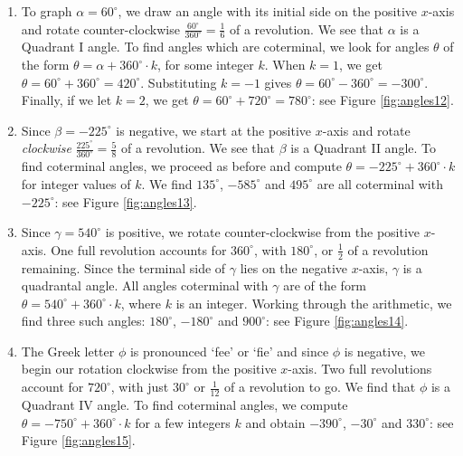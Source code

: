 {
\begin{enumerate}

\item  To graph $\alpha = 60^{\circ}$, we draw an angle with its initial side on the positive $x$-axis and rotate counter-clockwise $\frac{60^{\circ}}{360^{\circ}} = \frac{1}{6}$ of a revolution.  We see that $\alpha$ is a Quadrant I angle.  To find angles which are coterminal, we look for angles $\theta$ of the form $\theta = \alpha + 360^{\circ} \cdot k$, for some integer $k$.  When $k = 1$, we get $\theta =  60^{\circ} + 360^{\circ} = 420^{\circ}$.   Substituting $k = -1$ gives $\theta = 60^{\circ} - 360^{\circ} = -300^{\circ}$.  Finally, if we let $k = 2$, we get $\theta =  60^{\circ} + 720^{\circ} = 780^{\circ}$: see Figure \ref{fig:angles12}.  


\item  Since $\beta = - 225^{\circ}$ is negative, we start at the positive $x$-axis and rotate \textit{clockwise} $\frac{225^{\circ}}{360^{\circ}} = \frac{5}{8}$ of a revolution. We see that $\beta$ is a Quadrant II angle.  To find coterminal angles, we proceed as before and compute $\theta = -225^{\circ} + 360^{\circ} \cdot k$ for integer values of $k$.  We find $135^{\circ}$, $-585^{\circ}$ and $495^{\circ}$ are all coterminal with $-225^{\circ}$: see Figure \ref{fig:angles13}.   



\item Since $\gamma = 540^{\circ}$ is positive, we rotate counter-clockwise from the positive $x$-axis.  One full revolution accounts for $360^{\circ}$, with $180^{\circ}$, or $\frac{1}{2}$ of a revolution remaining.  Since the terminal side of $\gamma$ lies on the negative $x$-axis, $\gamma$ is a quadrantal angle.  All angles coterminal with $\gamma$ are of the form $\theta = 540^{\circ} + 360^{\circ} \cdot k$, where $k$ is an integer.  Working through the arithmetic, we find three such angles: $180^{\circ}$, $-180^{\circ}$ and $900^{\circ}$: see Figure \ref{fig:angles14}.


\item  The Greek letter $\phi$ is pronounced `fee' or `fie' and since $\phi$ is negative, we begin our rotation clockwise from the positive $x$-axis.  Two full revolutions account for $720^{\circ}$, with just $30^{\circ}$ or $\frac{1}{12}$ of a revolution to go. We find that $\phi$ is a Quadrant IV angle. To find coterminal angles, we compute $\theta = -750^{\circ} +   360^{\circ} \cdot k$ for a few integers $k$ and obtain $-390^{\circ}$, $-30^{\circ}$ and $330^{\circ}$: see Figure \ref{fig:angles15}. 


\end{enumerate}
}

